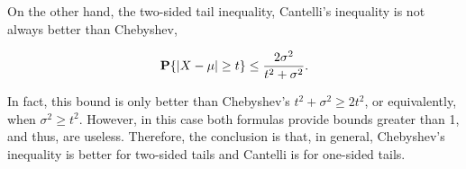 On the other hand, the two-sided tail inequality, Cantelli's inequality is not always better than Chebyshev,

\begin{corollary}
  \[\P\{|X-\mu| \geq t\} \leq \frac{2\sigma^2}{t^2 + \sigma^2}. \] 
\end{corollary}

In fact, this bound is only better than Chebyshev's $t^2+\sigma^2 \geq 2t^2$, or equivalently, when $\sigma^2 \geq t^2$. However, in this case both formulas provide bounds greater than 1, and thus, are useless. Therefore, the conclusion is that, in general, Chebyshev's inequality is better for two-sided tails and Cantelli is for one-sided tails.